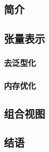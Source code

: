 \documentclass{article}
\begin{document}
\subsection{简介}
\subsection{张量表示}
\subsubsection{去泛型化}
\subsubsection{内存优化}
\subsection{组合视图}
\subsection{结语}
\end{document}
